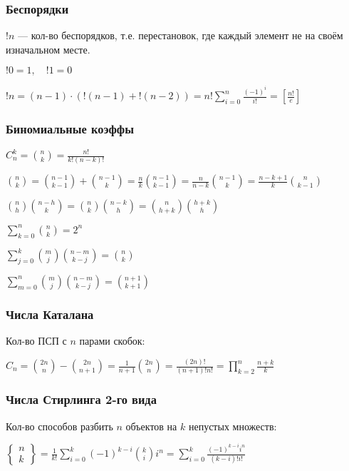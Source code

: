 \documentclass[10pt,a4paper,landscape,twosided]{extarticle}
\begin{document}
\begin{multicols}{3}
\subsubsection{Беспорядки}
$!n$ — кол-во беспорядков, т.е. перестановок, где каждый элемент не на своём изначальном месте.

$!0=1, \quad !1=0$

$!n=(n-1)\cdot(!(n-1)+!(n-2))=n!\sum\limits_{i=0}^n\frac{(-1)^i}{i!}=\left[\frac{n!}{e}\right]$

\subsubsection{Биномиальные коэффы}
$C_n^k=\binom{n}{k}=\frac{n!}{k!(n-k)!}$

$\binom{n}{k}=\binom{n-1}{k-1}+\binom{n-1}{k}=\frac{n}{k}\binom{n-1}{k-1}=\frac{n}{n-k}\binom{n-1}{k}=\frac{n-k+1}{k}\binom{n}{k-1}$

$\binom{n}{h}\binom{n-h}{k}=\binom{n}{k}\binom{n-k}{h}=\binom{n}{h+k}\binom{h+k}{h}$

$\sum\limits_{k=0}^n\binom{n}{k}=2^n$

$\sum\limits_{j=0}^k\binom{m}{j}\binom{n-m}{k-j}=\binom{n}{k}$

$\sum\limits_{m=0}^n\binom{m}{j}\binom{n-m}{k-j}=\binom{n+1}{k+1}$

\subsubsection{Числа Каталана}
Кол-во ПСП с $n$ парами скобок:

$C_n=\binom{2n}n-\binom{2n}{n+1}=\frac1{n+1}\binom{2n}n=\frac{(2n)!}{(n+1)!n!}=\prod\limits_{k=2}^n\frac{n+k}{k}$

\subsubsection{Числа Стирлинга 2-го вида}
Кол-во способов разбить $n$ объектов на $k$ непустых множеств:

$\begin{Bmatrix}
    n \\ k
\end{Bmatrix}=\frac{1}{k!}\sum\limits_{i=0}^k(-1)^{k-i}\binom{k}{i}i^n=\sum\limits_{i=0}^k\frac{(-1)^{k-i}i^n}{(k-i)!i!}$


\end{multicols}
\end{document}
